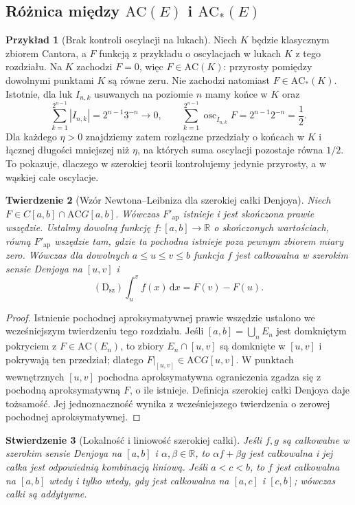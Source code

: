 \documentclass[11pt,a4paper]{article}
\numberwithin{equation}{section}
\theoremstyle{plain}
\newtheorem{twierdzenie}{Twierdzenie}[section]
\newtheorem{stwierdzenie}[twierdzenie]{Stwierdzenie}
\theoremstyle{definition}
\newtheorem{przyklad}[twierdzenie]{Przykład}
\theoremstyle{remark}
\newcommand{\R}{\mathbb R}
\newcommand{\osc}{\operatorname{osc}}
\newcommand{\AC}{\mathrm{AC}}
\begin{document}
\subsection*{Różnica między $\AC(E)$ i $\AC_*(E)$}
\begin{przyklad}[Brak kontroli oscylacji na lukach]\label{prz:ac-kontra-acstar}
Niech $K$ będzie klasycznym zbiorem Cantora, a $F$ funkcją z przykładu o oscylacjach w lukach $K$ z tego rozdziału. Na $K$ zachodzi $F=0$, więc $F\in\AC(K)$: przyrosty pomiędzy dowolnymi punktami $K$ są równe zeru. Nie zachodzi natomiast $F\in\AC_*(K)$. Istotnie, dla luk $I_{n,k}$ usuwanych na poziomie $n$ mamy końce w $K$ oraz
\[
\sum_{k=1}^{2^{n-1}}|I_{n,k}|=2^{n-1}3^{-n}\longrightarrow0,
\qquad
\sum_{k=1}^{2^{n-1}}\osc_{\overline I_{n,k}}F
=2^{n-1}2^{-n}=\frac12.
\]
Dla każdego $\eta>0$ znajdziemy zatem rozłączne przedziały o końcach w $K$ i łącznej długości mniejszej niż $\eta$, na których suma oscylacji pozostaje równa $1/2$. To pokazuje, dlaczego w szerokiej teorii kontrolujemy jedynie przyrosty, a w wąskiej całe oscylacje.
\end{przyklad}
\begin{twierdzenie}[Wzór Newtona--Leibniza dla szerokiej całki Denjoya]\label{tw:denjoy-szeroka-ftc}
Niech $F\in C[a,b]\cap\AC G[a,b]$. Wówczas $F'_{\mathrm{ap}}$ istnieje i jest skończona prawie wszędzie. Ustalmy dowolną funkcję $f:[a,b]\to\R$ o skończonych wartościach, równą $F'_{\mathrm{ap}}$ wszędzie tam, gdzie ta pochodna istnieje poza pewnym zbiorem miary zero. Wówczas dla dowolnych $a\le u\le v\le b$ funkcja $f$ jest całkowalna w szerokim sensie Denjoya na $[u,v]$ i
\[
 (\mathrm D_{\mathrm{sz}})\int_u^v f(x)\,\mathrm dx=F(v)-F(u).
\]
\end{twierdzenie}
\begin{proof}
Istnienie pochodnej aproksymatywnej prawie wszędzie ustalono we wcześniejszym twierdzeniu tego rozdziału. Jeśli $[a,b]=\bigcup_n E_n$ jest domkniętym pokryciem z $F\in\AC(E_n)$, to zbiory $E_n\cap[u,v]$ są domknięte w $[u,v]$ i pokrywają ten przedział; dlatego $F|_{[u,v]}\in\AC G[u,v]$. W punktach wewnętrznych $[u,v]$ pochodna aproksymatywna ograniczenia zgadza się z pochodną aproksymatywną $F$, o ile istnieje. Definicja szerokiej całki Denjoya daje tożsamość. Jej jednoznaczność wynika z wcześniejszego twierdzenia o zerowej pochodnej aproksymatywnej.
\end{proof}
\begin{stwierdzenie}[Lokalność i liniowość szerokiej całki]\label{st:denjoy-szeroka-lokalnosc}
Jeśli $f,g$ są całkowalne w szerokim sensie Denjoya na $[a,b]$ i $\alpha,\beta\in\R$, to $\alpha f+\beta g$ jest całkowalna i jej całka jest odpowiednią kombinacją liniową. Jeśli $a<c<b$, to $f$ jest całkowalna na $[a,b]$ wtedy i tylko wtedy, gdy jest całkowalna na $[a,c]$ i $[c,b]$; wówczas całki są addytywne.
\end{stwierdzenie}
\end{document}
